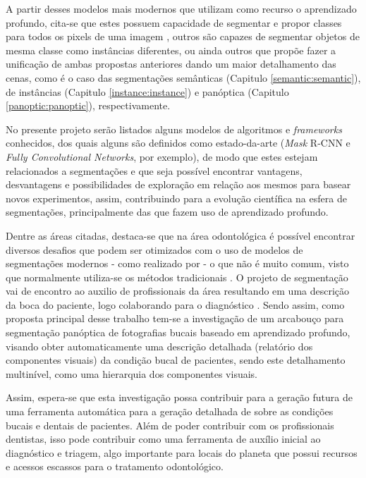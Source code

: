 A partir desses modelos mais modernos que utilizam como recurso o aprendizado profundo, cita-se que estes possuem capacidade de segmentar e propor classes para todos os pixels de uma imagem \cite{Minaee2021}, outros são capazes de segmentar objetos de mesma classe como instâncias diferentes, ou ainda outros que propõe fazer a unificação de ambas propostas anteriores dando um maior detalhamento das cenas, como é o caso das segmentações semânticas (Capitulo \ref{semantic:semantic}), de instâncias (Capitulo \ref{instance:instance}) e panóptica (Capitulo \ref{panoptic:panoptic}), respectivamente.

No presente projeto serão listados alguns modelos de algoritmos e \textit{frameworks} conhecidos, dos quais alguns são definidos como estado-da-arte (\textit{Mask} R-CNN e \textit{Fully Convolutional Networks}, por exemplo), de modo que estes estejam relacionados a segmentações e que seja possível encontrar vantagens, desvantagens e possibilidades de exploração em relação aos mesmos para basear novos experimentos, assim, contribuindo para a evolução científica na esfera de segmentações, principalmente das que fazem uso de aprendizado profundo.

Dentre as áreas citadas, destaca-se que na área odontológica é possível encontrar diversos desafios que podem ser otimizados com o uso de modelos de segmentações modernos - como realizado por \cite{Ghazvinian2021, Minyoung2020} - o que não é muito comum, visto que normalmente utiliza-se os métodos tradicionais \cite{Hammad2020}.  O projeto de segmentação vai de encontro ao auxilio de profissionais da área resultando em uma descrição da boca do paciente, logo colaborando para o diagnóstico \cite{Ghazvinian2021}. Sendo assim, como proposta principal desse trabalho tem-se a investigação de um arcabouço para segmentação panóptica de fotografias bucais baseado em aprendizado profundo, visando obter automaticamente uma descrição detalhada (relatório dos componentes visuais) da condição bucal de pacientes, sendo este detalhamento multinível, como uma hierarquia dos componentes visuais.

Assim, espera-se que esta investigação possa contribuir para a geração futura de uma ferramenta automática para a geração detalhada de sobre as condições bucais e dentais de pacientes. Além de poder contribuir com os profissionais dentistas, isso pode contribuir como uma ferramenta de auxílio inicial ao diagnóstico e triagem, algo importante para locais do planeta que possui recursos e acessos escassos para o tratamento odontológico.

